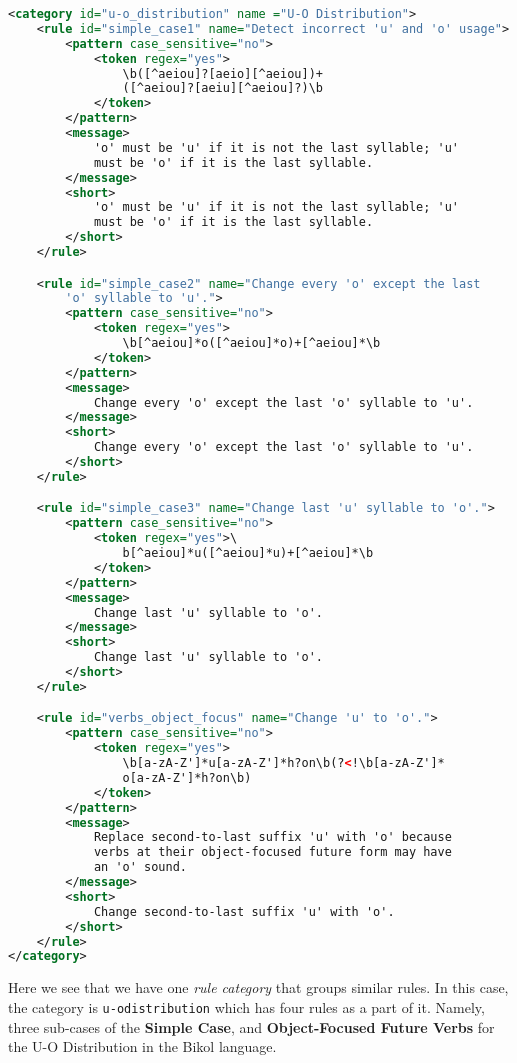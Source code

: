 \begin{lstlisting}[language= XML, caption=Grammar for U-O Distribution]
<category id="u-o_distribution" name ="U-O Distribution">
    <rule id="simple_case1" name="Detect incorrect 'u' and 'o' usage">
        <pattern case_sensitive="no"> 
            <token regex="yes">
                \b([^aeiou]?[aeio][^aeiou])+
                ([^aeiou]?[aeiu][^aeiou]?)\b
            </token>
        </pattern>
        <message>
            'o' must be 'u' if it is not the last syllable; 'u' 
            must be 'o' if it is the last syllable.
        </message>
        <short>
            'o' must be 'u' if it is not the last syllable; 'u' 
            must be 'o' if it is the last syllable.
        </short>
    </rule>

    <rule id="simple_case2" name="Change every 'o' except the last 
        'o' syllable to 'u'.">
        <pattern case_sensitive="no"> 
            <token regex="yes">
                \b[^aeiou]*o([^aeiou]*o)+[^aeiou]*\b
            </token>
        </pattern>
        <message>
            Change every 'o' except the last 'o' syllable to 'u'.
        </message>
        <short>
            Change every 'o' except the last 'o' syllable to 'u'.
        </short>
    </rule>

    <rule id="simple_case3" name="Change last 'u' syllable to 'o'.">
        <pattern case_sensitive="no"> 
            <token regex="yes">\
                b[^aeiou]*u([^aeiou]*u)+[^aeiou]*\b
            </token>
        </pattern>
        <message>
            Change last 'u' syllable to 'o'.
        </message>
        <short>
            Change last 'u' syllable to 'o'.
        </short>
    </rule>

    <rule id="verbs_object_focus" name="Change 'u' to 'o'.">
        <pattern case_sensitive="no"> 
            <token regex="yes">
                \b[a-zA-Z']*u[a-zA-Z']*h?on\b(?<!\b[a-zA-Z']*
                o[a-zA-Z']*h?on\b)
            </token>
        </pattern>
        <message>
            Replace second-to-last suffix 'u' with 'o' because 
            verbs at their object-focused future form may have 
            an 'o' sound. 
        </message>
        <short>
            Change second-to-last suffix 'u' with 'o'.
        </short>
    </rule>
</category>
\end{lstlisting}

Here we see that we have one \textit{rule category} that groups similar rules. In this case, the category is \texttt{u-o\textunderscore distribution} which has four rules as a part of it. Namely, three sub-cases of the \textbf{Simple Case}, and \textbf{Object-Focused Future Verbs} for the U-O Distribution in the Bikol language.

